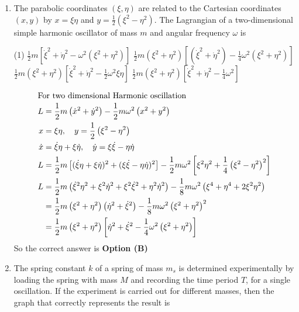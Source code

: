 \begin{enumerate}
	\item The parabolic coordinates $(\xi, \eta)$ are related to the Cartesian coordinates $(x, y)$ by $x=\xi \eta$ and $y=\frac{1}{2}\left(\xi^{2}-\eta^{2}\right)$. The Lagrangian of a two-dimensional simple harmonic oscillator of mass $m$ and angular frequency $\omega$ is
	{}
	\begin{tasks}(1)
		\task[\textbf{A.}] $\frac{1}{2} m\left[\dot{\xi}^{2}+\dot{\eta}^{2}-\omega^{2}\left(\xi^{2}+\eta^{2}\right)\right]$
		\task[\textbf{B.}] $\frac{1}{2} m\left(\xi^{2}+\eta^{2}\right)\left[\left(\dot{\xi}^{2}+\dot{\eta}^{2}\right)-\frac{1}{4} \omega^{2}\left(\xi^{2}+\eta^{2}\right)\right]$
		\task[\textbf{C.}] $\frac{1}{2} m\left(\xi^{2}+\eta^{2}\right)\left[\dot{\xi}^{2}+\dot{\eta}^{2}-\frac{1}{2} \omega^{2} \xi \eta\right]$
		\task[\textbf{D.}] $\frac{1}{2} m\left(\xi^{2}+\eta^{2}\right)\left[\dot{\xi}^{2}+\dot{\eta}^{2}-\frac{1}{4} \omega^{2}\right]$
	\end{tasks}	
\begin{answer}
	\begin{align*}
	\intertext{For two dimensional Harmonic oscillation}
	L&=\frac{1}{2} m\left(\dot{x}^{2}+\dot{y}^{2}\right)-\frac{1}{2} m \omega^{2}\left(x^{2}+y^{2}\right)\\
	x&=\xi \eta, \quad y=\frac{1}{2}\left(\xi^{2}-\eta^{2}\right)\\
	\dot{x}&=\dot{\xi} \eta+\xi \dot{\eta}, \quad \dot{y}=\xi \dot{\xi}-\eta \dot{\eta}\\
	L&=\frac{1}{2} m\left[(\dot{\xi} \eta+\xi \dot{\eta})^{2}+(\xi \dot{\xi}-\eta \dot{\eta})^{2}\right]-\frac{1}{2} m \omega^{2}\left[\xi^{2} \eta^{2}+\frac{1}{4}\left(\xi^{2}-\eta^{2}\right)^{2}\right]\\
	L&=\frac{1}{2} m\left(\dot{\xi}^{2} \eta^{2}+\xi^{2} \dot{\eta}^{2}+\xi^{2} \dot{\xi}^{2}+\eta^{2} \dot{\eta}^{2}\right)-\frac{1}{8} m \omega^{2}\left(\xi^{4}+\eta^{4}+2 \xi^{2} \eta^{2}\right)\\
	&=\frac{1}{2} m\left(\xi^{2}+\eta^{2}\right)\left(\dot{\eta}^{2}+\dot{\xi}^{2}\right)-\frac{1}{8} m \omega^{2}\left(\xi^{2}+\eta^{2}\right)^{2}\\
	&=\frac{1}{2} m\left(\xi^{2}+\eta^{2}\right)\left[\dot{\eta}^{2}+\dot{\xi}^{2}-\frac{1}{4} \omega^{2}\left(\xi^{2}+\eta^{2}\right)\right]
	\end{align*}
	So the correct answer is \textbf{Option (B)}
\end{answer}
	\item The spring constant $k$ of a spring of mass $m_{s}$ is determined experimentally by loading the spring with mass $M$ and recording the time period $T$, for a single oscillation. If the experiment is carried out for different masses, then the graph that correctly represents the result is

\end{enumerate}
